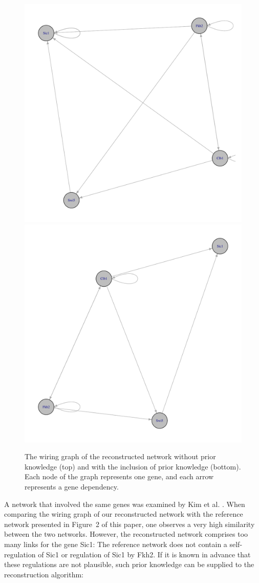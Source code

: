 \documentclass[a4paper]{article}
\begin{document}
\begin{figure}[p]
\centering
\includegraphics[width=0.5\linewidth]{wiring1}
\includegraphics[width=0.5\linewidth]{wiring2}
\caption{The wiring graph of the reconstructed network without prior knowledge (top) and with the inclusion of prior knowledge (bottom). Each node of the graph represents one gene, and each arrow represents a gene dependency.}
\label{fig:wiring}
\end{figure}

A network that involved the same genes was examined by Kim et al. \cite{kim07}. When comparing the wiring graph of our reconstructed network with the reference network presented in Figure~2 of this paper, one observes a very high similarity between the two networks. However, the reconstructed network comprises too many links for the gene Sic1: The reference network does not contain a self-regulation of Sic1 or regulation of Sic1 by Fkh2. If it is known in advance that these regulations are not plausible, such prior knowledge can be supplied to the reconstruction algorithm:

\begin{knitrout}
\color{fgcolor}\begin{kframe}
\begin{alltt}
 \hlkwb{<-} \hlopt{$}
                          \hlstd{=}\hlstd{,}
                          \hlstd{=}\hlstd{,}
                           \hlstd{=} \hlstd{(} \hlstd{=} \hlstd{(}\hlstd{,} \hlstd{)))}
\end{alltt}
\end{kframe}
\end{knitrout}
\end{document}
